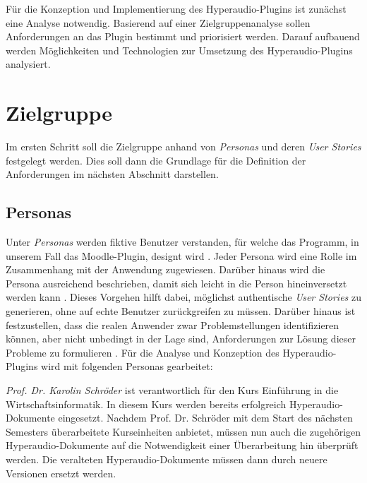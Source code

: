 \label{cha:analyse}
Für die Konzeption und Implementierung des Hyperaudio-Plugins ist zunächst eine Analyse notwendig. Basierend auf einer Zielgruppenanalyse sollen Anforderungen an das Plugin bestimmt und priorisiert werden. Darauf aufbauend werden Möglichkeiten und Technologien zur Umsetzung des Hyperaudio-Plugins analysiert.



\section{Zielgruppe}
Im ersten Schritt soll die Zielgruppe anhand von \textit{Personas} und deren \textit{User Stories} festgelegt werden. Dies soll dann die Grundlage für die Definition der Anforderungen im nächsten Abschnitt darstellen.


\subsection{Personas}
\label{sec:personas}
Unter \textit{Personas} werden fiktive Benutzer verstanden, für welche das Programm, in unserem Fall das Moodle-Plugin, designt wird \citep{cooper2004inmates}. Jeder Persona wird eine Rolle im Zusammenhang mit der Anwendung zugewiesen. Darüber hinaus wird die Persona ausreichend beschrieben, damit sich leicht in die Person hineinversetzt werden kann \citep{cohn2004user}. Dieses Vorgehen hilft dabei, möglichst authentische \textit{User Stories} zu generieren, ohne auf echte Benutzer zurückgreifen zu müssen. Darüber hinaus ist festzustellen, dass die realen Anwender zwar Problemstellungen identifizieren können, aber nicht unbedingt in der Lage sind, Anforderungen zur Lösung dieser Probleme zu formulieren \citep{cooper2004inmates}. Für die Analyse und Konzeption des Hyperaudio-Plugins wird mit folgenden Personas gearbeitet:

\par
\begingroup
\leftskip=1cm
\rightskip=1.5cm
\noindent

{\Large\emph{Prof. Dr. Karolin Schröder}} ist verantwortlich für den Kurs \glqq Einführung in die Wirtschaftsinformatik\grqq{}. In diesem Kurs werden bereits erfolgreich Hyperaudio-Dokumente eingesetzt. Nachdem Prof. Dr. Schröder mit dem Start des nächsten Semesters überarbeitete Kurseinheiten anbietet, müssen nun auch die zugehörigen Hyperaudio-Dokumente auf die Notwendigkeit einer Überarbeitung hin überprüft werden. Die veralteten Hyperaudio-Dokumente müssen dann durch neuere Versionen ersetzt werden.
\vspace{.5cm}


